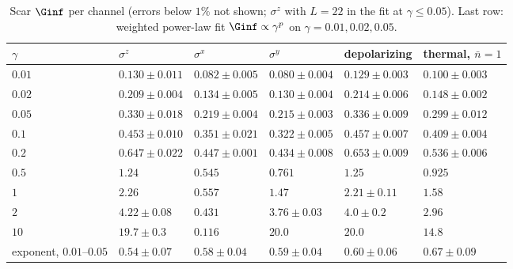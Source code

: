\begin{table}[H]
\centering
\small
\begin{tabular}{llllll}
\toprule
$\gamma$ & $\sigma^z$ & $\sigma^x$ & $\sigma^y$ & depolarizing & thermal, $\bar n = 1$ \\
\midrule
$0.01$ & $0.130 \pm 0.011$ & $0.082 \pm 0.005$ & $0.080 \pm 0.004$ & $0.129 \pm 0.003$ & $0.100 \pm 0.003$ \\
$0.02$ & $0.209 \pm 0.004$ & $0.134 \pm 0.005$ & $0.130 \pm 0.004$ & $0.214 \pm 0.006$ & $0.148 \pm 0.002$ \\
$0.05$ & $0.330 \pm 0.018$ & $0.219 \pm 0.004$ & $0.215 \pm 0.003$ & $0.336 \pm 0.009$ & $0.299 \pm 0.012$ \\
$0.1$ & $0.453 \pm 0.010$ & $0.351 \pm 0.021$ & $0.322 \pm 0.005$ & $0.457 \pm 0.007$ & $0.409 \pm 0.004$ \\
$0.2$ & $0.647 \pm 0.022$ & $0.447 \pm 0.001$ & $0.434 \pm 0.008$ & $0.653 \pm 0.009$ & $0.536 \pm 0.006$ \\
$0.5$ & $1.24$ & $0.545$ & $0.761$ & $1.25$ & $0.925$ \\
$1$ & $2.26$ & $0.557$ & $1.47$ & $2.21 \pm 0.11$ & $1.58$ \\
$2$ & $4.22 \pm 0.08$ & $0.431$ & $3.76 \pm 0.03$ & $4.0 \pm 0.2$ & $2.96$ \\
$10$ & $19.7 \pm 0.3$ & $0.116$ & $20.0$ & $20.0$ & $14.8$ \\
\midrule
exponent, $0.01$--$0.05$ & $0.54 \pm 0.07$ & $0.58 \pm 0.04$ & $0.59 \pm 0.04$ & $0.60 \pm 0.06$ & $0.67 \pm 0.09$ \\
\bottomrule
\end{tabular}
\caption{Scar $\Ginf$ per channel (errors below $1\%$ not shown; $\sigma^z$ with $L = 22$ in the fit at $\gamma \le 0.05$). Last row: weighted power-law fit $\Ginf \propto \gamma^{p}$ on $\gamma = 0.01, 0.02, 0.05$.}
\label{tab:chscar}
\end{table}

